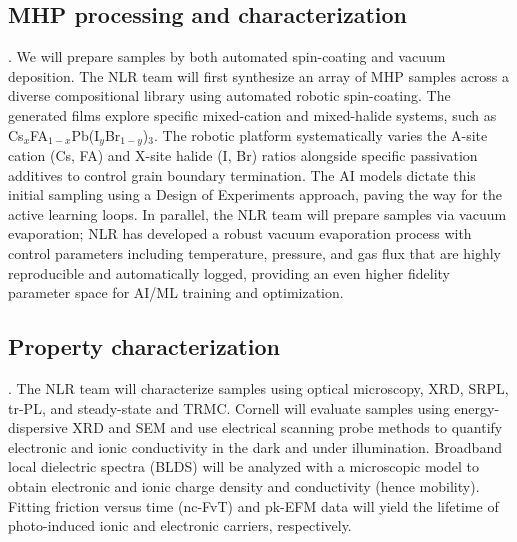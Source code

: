 \documentclass[pgs]{DOE}
\begin{document}
\subsection{MHP processing and characterization}.
We will prepare samples by both automated spin-coating and vacuum deposition.  
The NLR team will first synthesize an array of MHP samples across a diverse compositional library using automated robotic spin-coating. 
The generated films explore specific mixed-cation and mixed-halide systems, such as Cs$_{x}$FA$_{1-x}$Pb(I$_{y}$Br$_{1-y}$)$_3$.
The robotic platform systematically varies the A-site cation (Cs, FA) and X-site halide (I, Br) ratios alongside specific passivation additives to control grain boundary termination. 
The AI models dictate this initial sampling using a Design of Experiments approach, paving the way for the active learning loops.
In parallel, the NLR team will prepare samples via vacuum evaporation; NLR has developed a robust vacuum evaporation process with control parameters including temperature, pressure, and gas flux that are highly reproducible and automatically logged, providing an even higher fidelity parameter space for AI/ML training and optimization.

\subsection{Property characterization}.
The NLR team will characterize samples using optical microscopy, 
XRD, SRPL, tr-PL, and steady-state and TRMC. 
Cornell will evaluate samples using energy-dispersive XRD and SEM and use electrical scanning probe methods to quantify electronic and ionic conductivity in the dark and under illumination.
Broadband local dielectric spectra  \cite{Labardi2016may,Tirmzi2019jan,Tirmzi2020jun,Dwyer2019jun}(BLDS) will be analyzed with a microscopic model \cite{Lekkala2012sep,Lekkala2013nov} to obtain electronic and ionic charge density and conductivity (hence mobility).
Fitting friction versus time (nc-FvT) \cite{Tirmzi2017jan} and pk-EFM data \cite{Dwyer2017jun} will yield the lifetime of photo-induced ionic and electronic carriers, respectively.
\end{document}
